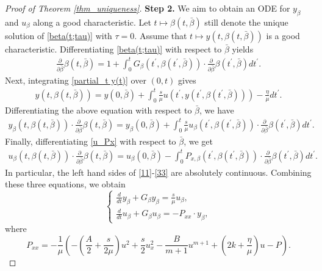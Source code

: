 \documentclass[10pt]{article}
\numberwithin{equation}{section}
\begin{document}
\begin{proof}[Proof of Theorem \ref{thm_uniqueness}]
		\textbf{Step 2.} We aim to obtain an ODE for $y_\beta$ and $u_\beta$ along a good characteristic. Let $t\mapsto\beta(t,\bar{\beta})$ still denote the unique solution of \eqref{beta(t;tau)} with $\tau=0$. Assume that $t\mapsto y(t,\beta(t,\bar{\beta}))$ is a good characteristic. Differentiating \eqref{beta(t;tau)} with respect to $\bar{\beta}$ yields		
		\begin{align}\label{11}
			\frac{\partial}{\partial\bar{\beta}}\beta(t,\bar{\beta})=1+\int_{0}^{t}G_{\beta}(t^\prime,\beta(t^\prime,\bar{\beta}))\cdot\frac{\partial}{\partial\bar{\beta}}\beta(t^\prime,\bar{\beta})dt^\prime.
		\end{align}
		Next, integrating \eqref{partial_t y(t)} over $(0,t)$ gives 
		\begin{align*}
			y(t,\beta(t,\bar{\beta}))=y(0,\bar{\beta})+\int_0^t\frac{s}{\mu}u(t^\prime,y(t^\prime,\beta(t^\prime,\bar{\beta})))-\frac{\eta}{\mu}dt^\prime.
		\end{align*}
		Differentiating the above equation with respect to $\bar{\beta}$, we have
		\begin{align}\label{22}
			y_{\beta}(t,\beta(t,\bar{\beta}))\cdot\frac{\partial}{\partial\bar{\beta}}\beta(t,\bar{\beta})=y_{\beta}(0,\bar{\beta})+\int_{0}^{t}\frac{s}{\mu}u_{\beta}(t^\prime,\beta(t^\prime,\bar{\beta}))\cdot\frac{\partial}{\partial\bar{\beta}}\beta(t^\prime,\bar{\beta})dt^\prime.
		\end{align}
		Finally, differentiating \eqref{u_Px} with respect to $\bar{\beta}$, we get
		\begin{align}\label{33}
			u_{\beta}(t,\beta(t,\bar{\beta}))\cdot\frac{\partial}{\partial\bar{\beta}}\beta(t,\bar{\beta})=u_{\beta}(0,\bar{\beta})-\int_{0}^{t}P_{x,\beta}(t^\prime,\beta(t^\prime,\bar{\beta}))\cdot\frac{\partial}{\partial\bar{\beta}}\beta(t^\prime,\bar{\beta})dt^\prime.
		\end{align}
		In particular, the left hand sides of \eqref{11}-\eqref{33} are absolutely continuous. Combining these three equations, we obtain
		\begin{equation}
			\left\{
			\begin{array}{l}
				\frac{d}{dt}y_\beta+G_\beta y_\beta=\frac{s}{\mu}u_\beta, \\
				\frac{d}{dt}u_\beta+G_\beta u_\beta=-P_{xx}\cdot y_\beta,
			\end{array}\right.
		\end{equation}
		where
		$$
		P_{xx}=-\frac{1}{\mu}\left(-\left(\frac{A}{2}+\frac{s}{2\mu}\right)u^2+\frac{s}{2}u_x^2-\frac{B}{m+1}u^{m+1}+\left(2k+\frac{\eta}{\mu}\right)u-P\right).$$
		

\end{proof}
\end{document}
